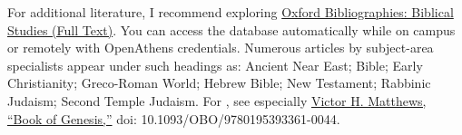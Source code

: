 \documentclass[titlepage]{article}
\begin{document}
For additional literature, I recommend exploring \href{https://go.openathens.net/redirector/astheology.ns.ca?url=https://www.oxfordbibliographies.com/obo/page/biblical-studies}{Oxford Bibliographies: Biblical Studies (Full Text)}.
You can access the database automatically while on campus or remotely
with OpenAthens credentials. Numerous articles by subject-area
specialists appear under such headings as: Ancient Near East; Bible;
Early Christianity; Greco-Roman World; Hebrew Bible; New Testament;
Rabbinic Judaism; Second Temple Judaism. For \ccode, see especially
\href{https://go.openathens.net/redirector/astheology.ns.ca?url=https://www.oxfordbibliographies.com/view/document/obo-9780195393361/obo-9780195393361-0044.xml}{Victor H. Matthews, “Book of Genesis,”} doi: 10.1093/OBO/9780195393361-0044.
\end{document}
